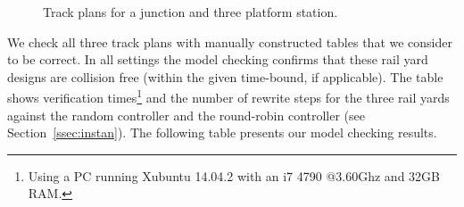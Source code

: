 \begin{figure}[H]
\caption{Track plans for a junction and three platform station.}
\label{fig:junction}
\label{fig:threestation}
\end{figure}

We check all three track plans with manually constructed tables that
we consider to be correct. In all settings the model checking confirms
that these rail yard designs are collision free (within the given
time-bound, if applicable).  The table shows verification
times\footnote{Using a PC running Xubuntu
  14.04.2 with an i7 4790 @3.60Ghz and 32GB RAM.} and the number of
rewrite steps for the three rail yards against the random controller
and the round-robin controller (see Section~\ref{ssec:instan}).  The
following table presents our model checking results.
%
%

